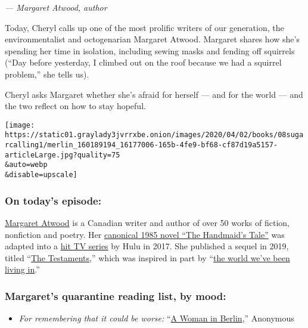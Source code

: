 \emph{--- Margaret Atwood, author}

Today, Cheryl calls up one of the most prolific writers of our
generation, the environmentalist and octogenarian Margaret Atwood.
Margaret shares how she's spending her time in isolation, including
sewing masks and fending off squirrels (``Day before yesterday, I
climbed out on the roof because we had a squirrel problem,'' she tells
us).

Cheryl asks Margaret whether she's afraid for herself --- and for the
world --- and the two reflect on how to stay hopeful.

\texttt{[image: https://static01.graylady3jvrrxbe.onion/images/2020/04/02/books/08sugarcalling1/merlin\_160189194\_16177006-165b-4fe9-bf68-cf87d19a5157-articleLarge.jpg?quality=75\\\&auto=webp\\\&disable=upscale]}

\hypertarget{on-todays-episode}{%
\subsubsection{\texorpdfstring{\textbf{On today's
episode:}}{On today's episode:}}\label{on-todays-episode}}

\href{http://margaretatwood.ca/}{Margaret Atwood} is a Canadian writer
and author of over 50 works of fiction, nonfiction and poetry. Her
\href{https://www.nytimes3xbfgragh.onion/2017/03/10/books/review/margaret-atwood-handmaids-tale-age-of-trump.html}{canonical
1985 novel ``The Handmaid's Tale''} was adapted into a
\href{https://www.nytimes3xbfgragh.onion/2017/04/24/arts/television/review-the-handmaids-tale-creates-a-chilling-mans-world.html?module=inline}{hit
TV series} by Hulu in 2017. She published a sequel in 2019, titled
``\href{https://www.nytimes3xbfgragh.onion/2019/09/03/books/review/testaments-margaret-atwood-handmaids-tale.html}{The
Testaments},'' which was inspired in part by
``\href{https://www.nytimes3xbfgragh.onion/2018/11/28/books/margaret-atwood-sequel-handmaids-tale-testaments.html}{the
world we've been living in}.''

\hypertarget{margarets-quarantine-reading-list-by-mood}{%
\subsubsection{\texorpdfstring{\textbf{Margaret's quarantine reading
list, by
mood:}}{Margaret's quarantine reading list, by mood:}}\label{margarets-quarantine-reading-list-by-mood}}

\begin{itemize}
\tightlist
\item
  \emph{For remembering that it could be worse:}
  ``\href{https://www.amazon.com/Woman-Berlin/dp/1844081117}{A Woman in
  Berlin},'' Anonymous
\end{itemize}

